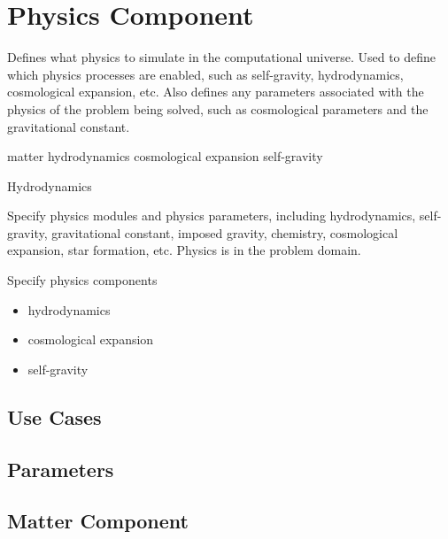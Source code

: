 
\section{Physics Component} \label{s:component-physics}

   Defines what physics to simulate in the computational universe.
   Used to define which physics processes are enabled, such as
   self-gravity, hydrodynamics, cosmological expansion, etc.  Also
   defines any parameters associated with the physics of the problem
   being solved, such as cosmological parameters and the gravitational
   constant.


 matter
 hydrodynamics
  cosmological expansion
 self-gravity

Hydrodynamics


Specify physics modules and physics parameters, including
hydrodynamics, self-gravity, gravitational constant, imposed gravity,
chemistry, cosmological expansion, star formation, etc.  Physics is in
the problem domain.

Specify physics components

\begin{itemize}
\item hydrodynamics
\item  cosmological expansion
\item self-gravity
\end{itemize}

\subsection{Use Cases}
\subsection{Parameters}

\subsection{Matter Component} \label{ss:component-matter}

